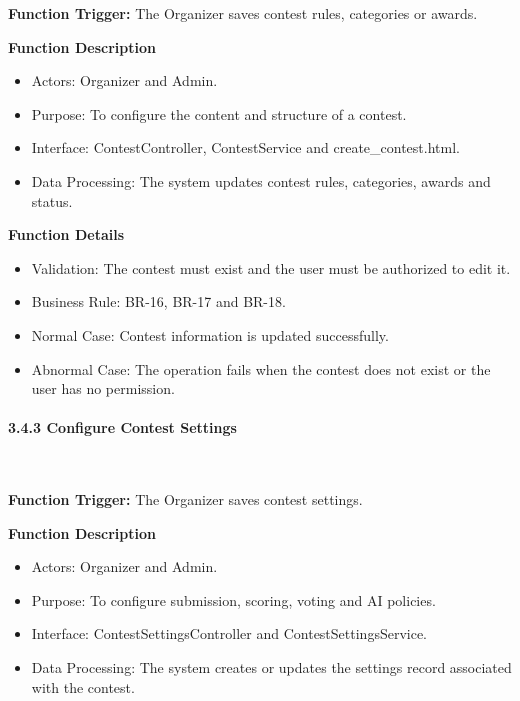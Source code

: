 \textbf{Function Trigger:} The Organizer saves contest rules, categories or awards.

\textbf{Function Description}
\begin{itemize}[leftmargin=1.5em, nosep]
    \item Actors: Organizer and Admin.
    \item Purpose: To configure the content and structure of a contest.
    \item Interface: ContestController, ContestService and create\_contest.html.
    \item Data Processing: The system updates contest rules, categories, awards and status.
\end{itemize}

\textbf{Function Details}
\begin{itemize}[leftmargin=1.5em, nosep]
    \item Validation: The contest must exist and the user must be authorized to edit it.
    \item Business Rule: BR-16, BR-17 and BR-18.
    \item Normal Case: Contest information is updated successfully.
    \item Abnormal Case: The operation fails when the contest does not exist or the user has no permission.
\end{itemize}

\paragraph*{3.4.3 Configure Contest Settings}\leavevmode\\[-0.5em]
\label{par:configure-contest-settings}

\textbf{Function Trigger:} The Organizer saves contest settings.

\textbf{Function Description}
\begin{itemize}[leftmargin=1.5em, nosep]
    \item Actors: Organizer and Admin.
    \item Purpose: To configure submission, scoring, voting and AI policies.
    \item Interface: ContestSettingsController and ContestSettingsService.
    \item Data Processing: The system creates or updates the settings record associated with the contest.
\end{itemize}

